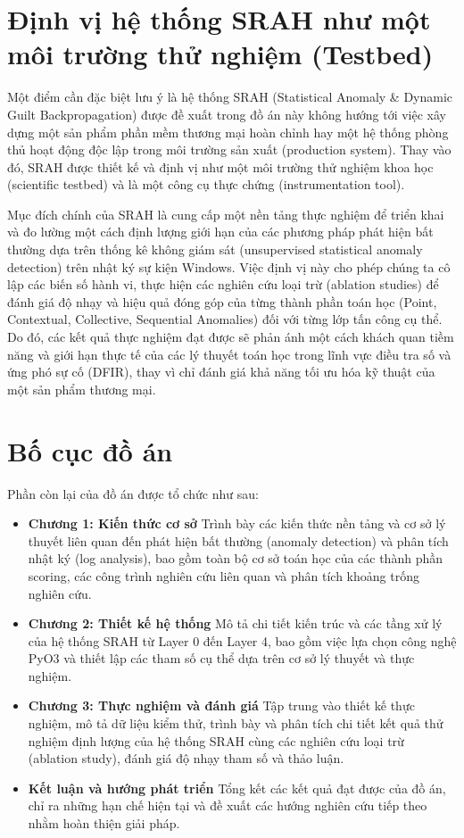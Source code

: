 \documentclass[../main.tex]{subfiles}
\begin{document}
\section*{Định vị hệ thống SRAH như một môi trường thử nghiệm (Testbed)}

Một điểm cần đặc biệt lưu ý là hệ thống SRAH (Statistical Anomaly \& Dynamic Guilt Backpropagation) được đề xuất trong đồ án này không hướng tới việc xây dựng một sản phẩm phần mềm thương mại hoàn chỉnh hay một hệ thống phòng thủ hoạt động độc lập trong môi trường sản xuất (production system). Thay vào đó, SRAH được thiết kế và định vị như một môi trường thử nghiệm khoa học (scientific testbed) và là một công cụ thực chứng (instrumentation tool).

Mục đích chính của SRAH là cung cấp một nền tảng thực nghiệm để triển khai và đo lường một cách định lượng giới hạn của các phương pháp phát hiện bất thường dựa trên thống kê không giám sát (unsupervised statistical anomaly detection) trên nhật ký sự kiện Windows. Việc định vị này cho phép chúng ta cô lập các biến số hành vi, thực hiện các nghiên cứu loại trừ (ablation studies) để đánh giá độ nhạy và hiệu quả đóng góp của từng thành phần toán học (Point, Contextual, Collective, Sequential Anomalies) đối với từng lớp tấn công cụ thể. Do đó, các kết quả thực nghiệm đạt được sẽ phản ánh một cách khách quan tiềm năng và giới hạn thực tế của các lý thuyết toán học trong lĩnh vực điều tra số và ứng phó sự cố (DFIR), thay vì chỉ đánh giá khả năng tối ưu hóa kỹ thuật của một sản phẩm thương mại.

\section*{Bố cục đồ án}

Phần còn lại của đồ án được tổ chức như sau:

\begin{itemize}
    \item \textbf{Chương 1: Kiến thức cơ sở} Trình bày các kiến thức nền tảng và cơ sở lý thuyết liên quan đến phát hiện bất thường (anomaly detection) và phân tích nhật ký (log analysis), bao gồm toàn bộ cơ sở toán học của các thành phần scoring, các công trình nghiên cứu liên quan và phân tích khoảng trống nghiên cứu.
    \item \textbf{Chương 2: Thiết kế hệ thống} Mô tả chi tiết kiến trúc và các tầng xử lý của hệ thống SRAH từ Layer 0 đến Layer 4, bao gồm việc lựa chọn công nghệ PyO3 và thiết lập các tham số cụ thể dựa trên cơ sở lý thuyết và thực nghiệm.
    \item \textbf{Chương 3: Thực nghiệm và đánh giá} Tập trung vào thiết kế thực nghiệm, mô tả dữ liệu kiểm thử, trình bày và phân tích chi tiết kết quả thử nghiệm định lượng của hệ thống SRAH cùng các nghiên cứu loại trừ (ablation study), đánh giá độ nhạy tham số và thảo luận.
    \item \textbf{Kết luận và hướng phát triển} Tổng kết các kết quả đạt được của đồ án, chỉ ra những hạn chế hiện tại và đề xuất các hướng nghiên cứu tiếp theo nhằm hoàn thiện giải pháp.
\end{itemize}
\end{document}
